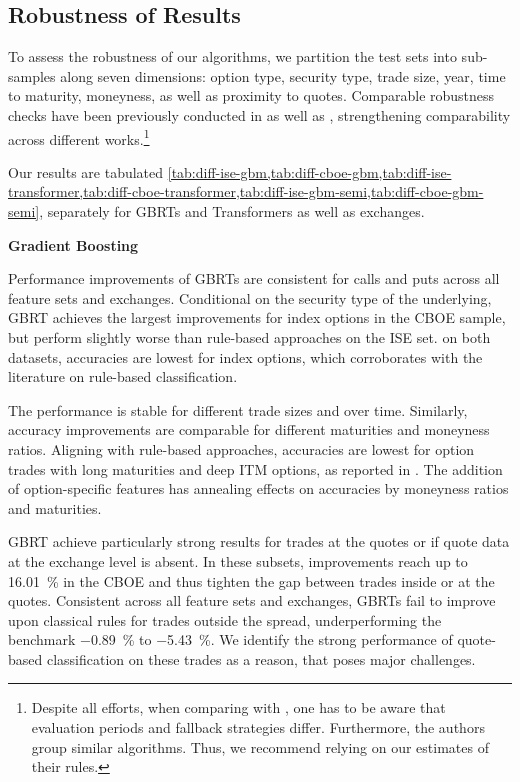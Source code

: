 \subsection{Robustness of Results}\label{sec:robustness-checks}


To assess the robustness of our algorithms, we partition the test sets into sub-samples along seven dimensions: option type, security type, trade size, year, time to maturity, moneyness, as well as proximity to quotes. Comparable robustness checks have been previously conducted in \textcite[][47]{grauerOptionTradeClassification2022} as well as  \textcite[][890--892]{savickasInferringDirectionOption2003}, strengthening comparability across different works.\footnote{Despite all efforts, when comparing with \textcite[][47--52]{grauerOptionTradeClassification2022}, one has to be aware that evaluation periods and fallback strategies differ. Furthermore, the authors group similar algorithms. Thus, we recommend relying on our estimates of their rules.}

Our results are tabulated \cref{tab:diff-ise-gbm,tab:diff-cboe-gbm,tab:diff-ise-transformer,tab:diff-cboe-transformer,tab:diff-ise-gbm-semi,tab:diff-cboe-gbm-semi}, separately for \glspl{GBRT} and Transformers as well as exchanges.

\clearpage

\textbf{Gradient Boosting}

Performance improvements of \glspl{GBRT} are consistent for calls and puts across all feature sets and exchanges. Conditional on the security type of the underlying, \gls{GBRT} achieves the largest improvements for index options in the \gls{CBOE} sample, but perform slightly worse than rule-based approaches on the \gls{ISE} set. on both datasets, accuracies are lowest for index options, which corroborates with the literature on rule-based classification.

The performance is stable for different trade sizes and over time. Similarly, accuracy improvements are comparable for different maturities and moneyness ratios. Aligning with rule-based approaches, accuracies are lowest for option trades with long maturities and deep \gls{ITM} options, as reported in \textcite[][22]{grauerOptionTradeClassification2022}. The addition of option-specific features has annealing effects on accuracies by moneyness ratios and maturities.

\gls{GBRT} achieve particularly strong results for trades at the quotes or if quote data at the exchange level is absent. In these subsets, improvements reach up to \SI{16.01}{\percent} in the \gls{CBOE} and thus tighten the gap between trades inside or at the quotes. Consistent across all feature sets and exchanges, \glspl{GBRT} fail to improve upon classical rules for trades outside the spread, underperforming the benchmark \SI{-0.89}{\percent} to \SI{-5.43}{\percent}. We identify the strong performance of quote-based classification on these trades as a reason, that poses major challenges.

